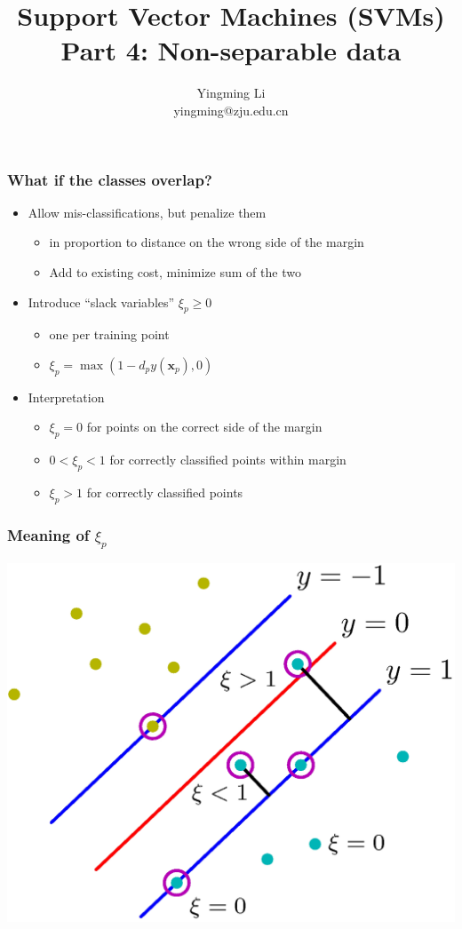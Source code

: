\documentclass[12pt,notes,mathserif]{beamer}
\title{ Support Vector Machines (SVMs)\\Part 4: Non-separable data}
\author[YingmingLi]{Yingming Li \\ yingming@zju.edu.cn}
\institute[DSERC, ZJU]{Data Science \& Engineering Research Center, ZJU}
\begin{document}

\begin{frame}[c]
	\titlepage
\end{frame}

\begin{frame}[c]
\frametitle{What if the classes overlap?}
\begin{itemize}
\item  Allow mis-classifications, but penalize them
\begin{itemize}
\item  in proportion to distance on the wrong side of the margin
\item  Add to existing cost, minimize sum of the two
\end{itemize}
\item Introduce ``slack variables'' $\xi_p\geqslant{}0$
\begin{itemize}
\item one per training point
\item $\xi_p=\max (1-d_py(\mathbf{x}_p),0)$
\end{itemize}
\item Interpretation
\begin{itemize}
\item $\xi_p=0$ for points on the correct side of the margin
\item $0<\xi_p < 1$ for correctly classified points within margin
\item $\xi_p>1$ for correctly classified points
\end{itemize}
\end{itemize}
\end{frame}


\begin{frame}[c]
\frametitle{Meaning of $\xi_p$}
\begin{center}
\includegraphics[width=0.7\linewidth]{fig10/lec113.jpg}
\end{center}
\end{frame}
\end{document}
